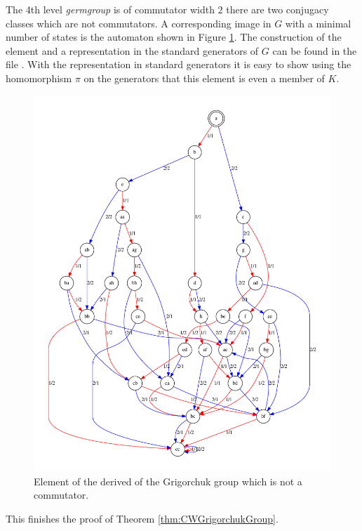 \documentclass[a4paper,11pt]{amsart}
\begin{document}
The 4th level \emph{germgroup} is of commutator width $2$ there are two conjugacy classes which are 
not commutators. A corresponding image in $G$ with a minimal number of states is the automaton shown in Figure \ref{fig:noncomm}. 
The construction of the element and a representation in the standard generators of $G$ can be found in the file
 . With the representation in standard generators it is easy to show using the 
 homomorphism $\pi$ on the generators that this element is even a member of $K$.
\begin{figure}
 \includegraphics[width=\textwidth]{gap/PCD/noncomm29states}
 \caption{Element of the derived of the Grigorchuk group which is not a commutator.}\label{fig:noncomm}
\end{figure}
This finishes the proof of Theorem \ref{thm:CWGrigorchukGroup}.
\end{document}
